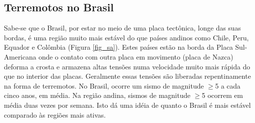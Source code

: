 \documentclass[jgrga]{agutex}
\begin{document}


\begin{article}

\section{Terremotos no Brasil}

Sabe-se que o Brasil, por estar no meio de uma placa tectônica, longe das suas bordas, é uma região muito mais estável do que países andinos como Chile, Peru, Equador e Colômbia (Figura \ref{fig_sa}). Estes países estão na borda da Placa Sul-Americana onde o contato com outra placa em movimento (placa de Nazca) deforma a crosta e armazena altas tensões numa velocidade muito mais rápida do que no interior das placas. Geralmente essas tensões são liberadas repentinamente na forma de terremotos.  No Brasil, ocorre um sismo de magnitude $\geq$5 a cada cinco anos, em média. Na região andina, sismos de magnitude $\geq$5 ocorrem em média duas vezes por semana.  Isto dá uma idéia de quanto o Brasil é mais estável comparado às regiões mais ativas.


\end{article}
\end{document}
